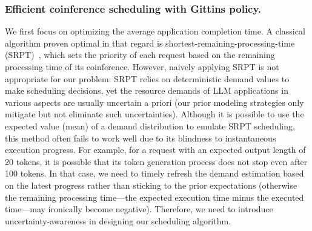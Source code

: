\subsubsection{Efficient coinference scheduling with Gittins policy.}
\label{subsubsec:gittins}
We first focus on optimizing the average application completion time. 
A classical algorithm proven optimal in that regard is shortest-remaining-processing-time (SRPT)~\cite{schrage1968proof}, which sets the priority of each request based on the remaining processing time of its coinference.
However, naively applying SRPT is not appropriate for our problem: SRPT relies on deterministic demand values to make scheduling decisions, yet the resource demands of LLM applications in various aspects are usually uncertain a priori (our prior modeling strategies only mitigate but not eliminate such uncertainties). 
Although it is possible to use the expected value (mean) of a demand distribution to emulate SRPT scheduling, this method often fails to work well due to its blindness to instantaneous execution progress.		
For example, for a request with an expected output length of 20 tokens, it is possible that its token generation process does not stop even after 100 tokens.
In that case, we need to timely refresh the demand estimation based on the latest progress rather than sticking to the prior expectations (otherwise the remaining processing time---the expected execution time minus the executed time---may ironically become negative). 
Therefore, we need to introduce uncertainty-awareness in designing our scheduling algorithm.

